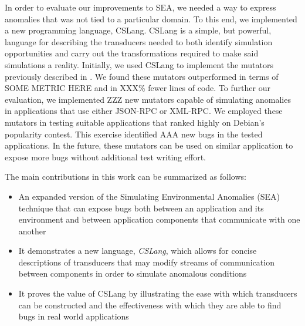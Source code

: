 In order to evaluate our improvements to SEA, we needed a way to express
anomalies that was not tied to a particular domain.  To this end, we
implemented a new programming language, CSLang.  CSLang is a simple, but
powerful, language for describing the transducers needed to both identify
simulation opportunities and carry out the transformations required to make
said simulations a reality.  Initially, we used CSLang to implement the
mutators previously described in . We found these mutators outperformed in terms of SOME METRIC HERE and
in XXX\% fewer lines of code.  To further our evaluation, we implemented ZZZ new
mutators capable of simulating anomalies in applications that use either
JSON-RPC or XML-RPC.  We employed these mutators in testing suitable
applications that ranked highly on Debian's popularity contest.  This
exercise identified AAA new bugs in the tested applications.  In the
future, these mutators can be used on similar application to expose more
bugs without additional test writing effort.


The main contributions in this work can be summarized as follows:

\begin{itemize}

\item{An expanded version of the Simulating Environmental Anomalies (SEA)
  technique that can expose bugs both between an application and its
    environment and between application components that communicate with
    one another}

\item{It demonstrates a new language, {\em CSLang},
which allows for concise descriptions of transducers that may
modify streams of communication between components in order to simulate
anomalous conditions}

\item{It proves the value of CSLang by illustrating the ease with which
  transducers can be constructed and the effectiveness with which they are
    able to find bugs in real world applications }

\end{itemize}
